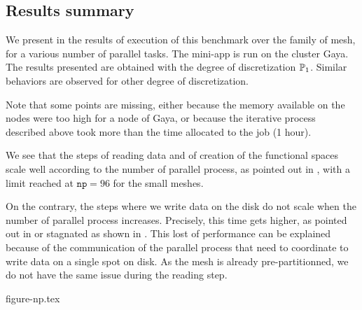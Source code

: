 
\subsection{Results summary}



We present in  the results of execution of this benchmark over the family of mesh, for a various number of parallel tasks.
The mini-app is run on the cluster Gaya.
The results presented are obtained with the degree of discretization $\mathbb{P}_1$.
Similar behaviors are observed for other degree of discretization.

Note that some points are missing, either because the memory available on the nodes were too high for a node of Gaya, or because the iterative process described above took more than the time allocated to the job (1 hour).

We see that the steps of reading data and of creation of the functional spaces scale well according to the number of parallel process, as pointed out in , with a limit reached at $\texttt{np}=96$ for the small meshes.

On the contrary, the steps where we write data on the disk do not scale when the number of parallel process increases.
Precisely, this time gets higher, as pointed out in  or stagnated as shown in .
This lost of performance can be explained because of the communication of the parallel process that need to coordinate to write data on a single spot on disk.
As the mesh is already pre-partitionned, we do not have the same issue during the reading step.

{figure-np.tex}

\dataLoadMesh
{}\dataFunctionSpace
{}\dataSaveMesh
{}\dataExportData


